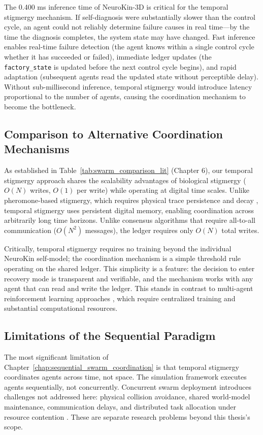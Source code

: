 \documentclass[12pt,a4paper,oneside]{report}
\begin{document}
The 0.400 ms inference time of NeuroKin-3D is critical for the temporal stigmergy mechanism. If self-diagnosis were substantially slower than the control cycle, an agent could not reliably determine failure causes in real time---by the time the diagnosis completes, the system state may have changed. Fast inference enables real-time failure detection (the agent knows within a single control cycle whether it has succeeded or failed), immediate ledger updates (the \texttt{factory\_state} is updated before the next control cycle begins), and rapid adaptation (subsequent agents read the updated state without perceptible delay). Without sub-millisecond inference, temporal stigmergy would introduce latency proportional to the number of agents, causing the coordination mechanism to become the bottleneck.

\subsection{Comparison to Alternative Coordination Mechanisms}

As established in Table~\ref{tab:swarm_comparison_lit} (Chapter 6), our temporal stigmergy approach shares the scalability advantages of biological stigmergy ($O(N)$ writes, $O(1)$ per write) while operating at digital time scales. Unlike pheromone-based stigmergy, which requires physical trace persistence and decay \cite{bongard2006resilient}, temporal stigmergy uses persistent digital memory, enabling coordination across arbitrarily long time horizons. Unlike consensus algorithms that require all-to-all communication ($O(N^2)$ messages), the ledger requires only $O(N)$ total writes.

Critically, temporal stigmergy requires no training beyond the individual NeuroKin self-model; the coordination mechanism is a simple threshold rule operating on the shared ledger. This simplicity is a feature: the decision to enter recovery mode is transparent and verifiable, and the mechanism works with any agent that can read and write the ledger. This stands in contrast to multi-agent reinforcement learning approaches \cite{domberg2026selfadapting, daneshmand2026slowrl}, which require centralized training and substantial computational resources.

\subsection{Limitations of the Sequential Paradigm}

The most significant limitation of Chapter~\ref{chap:sequential_swarm_coordination} is that temporal stigmergy coordinates agents across time, not space. The simulation framework executes agents sequentially, not concurrently. Concurrent swarm deployment introduces challenges not addressed here: physical collision avoidance, shared world-model maintenance, communication delays, and distributed task allocation under resource contention \cite{matsuki2024gaussian, keetha2024splattam}. These are separate research problems beyond this thesis's scope.
\end{document}
